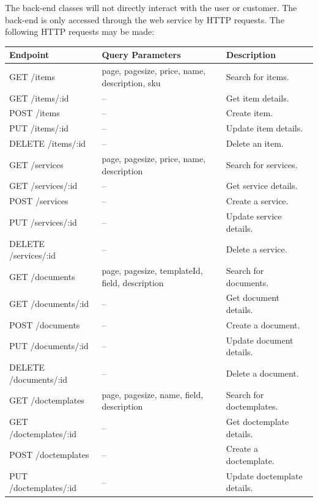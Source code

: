 \documentclass{article}
\begin{document}
The back-end classes will not directly interact with the user or customer.  The
back-end is only accessed through the web service by HTTP requests.  The following
HTTP requests may be made:

\begin{table}[H]
    \centering
    \begin{tabular}{|l|p{4.5cm}|l|}\hline
        Endpoint & Query Parameters & Description\\\hline\hline
         GET /items & page, pagesize, price, name, description, sku & Search for items. \\\hline
         GET /items/:id & -- & Get item details. \\\hline
         POST /items & -- & Create item. \\\hline
         PUT /items/:id & -- & Update item details. \\\hline
         DELETE /items/:id & -- & Delete an item. \\\hline
         GET /services & page, pagesize, price, name, description & Search for services. \\\hline
         GET /services/:id & -- & Get service details. \\\hline
         POST /services & -- & Create a service. \\\hline
         PUT /services/:id & -- & Update service details. \\\hline
         DELETE /services/:id & -- & Delete a service. \\\hline
         GET /documents & page, pagesize, templateId, field, description & Search for documents. \\\hline
         GET /documents/:id & -- & Get document details. \\\hline
         POST /documents & -- & Create a document. \\\hline
         PUT /documents/:id & -- & Update document details. \\\hline
         DELETE /documents/:id & -- & Delete a document. \\\hline
         GET /doctemplates & page, pagesize, name, field, description & Search for doctemplates. \\\hline
         GET /doctemplates/:id & -- & Get doctemplate details. \\\hline
         POST /doctemplates & -- & Create a doctemplate. \\\hline
         PUT /doctemplates/:id & -- & Update doctemplate details. \\\hline

\end{tabular}
\end{table}
\end{document}
